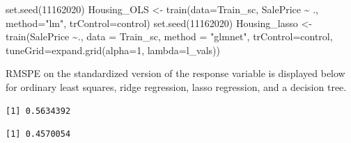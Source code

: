 \documentclass[
  letterpaper,
  DIV=11,
  numbers=noendperiod]{scrreprt}
\newenvironment{Shaded}{\begin{snugshade}}{\end{snugshade}}
\newcommand{\AttributeTok}[1]{\textcolor[rgb]{0.40,0.45,0.13}{#1}}
\newcommand{\DecValTok}[1]{\textcolor[rgb]{0.68,0.00,0.00}{#1}}
\newcommand{\FunctionTok}[1]{\textcolor[rgb]{0.28,0.35,0.67}{#1}}
\newcommand{\NormalTok}[1]{\textcolor[rgb]{0.00,0.23,0.31}{#1}}
\newcommand{\OtherTok}[1]{\textcolor[rgb]{0.00,0.23,0.31}{#1}}
\newcommand{\SpecialCharTok}[1]{\textcolor[rgb]{0.37,0.37,0.37}{#1}}
\newcommand{\StringTok}[1]{\textcolor[rgb]{0.13,0.47,0.30}{#1}}
\begin{document}
\begin{Shaded}
\begin{Highlighting}[]
\FunctionTok{set.seed}\NormalTok{(}\DecValTok{11162020}\NormalTok{)}
\NormalTok{Housing\_OLS }\OtherTok{\textless{}{-}} \FunctionTok{train}\NormalTok{(}\AttributeTok{data=}\NormalTok{Train\_sc, SalePrice }\SpecialCharTok{\textasciitilde{}}\NormalTok{ .,  }\AttributeTok{method=}\StringTok{"lm"}\NormalTok{, }\AttributeTok{trControl=}\NormalTok{control)}
\FunctionTok{set.seed}\NormalTok{(}\DecValTok{11162020}\NormalTok{)}
\NormalTok{Housing\_lasso }\OtherTok{\textless{}{-}} \FunctionTok{train}\NormalTok{(SalePrice }\SpecialCharTok{\textasciitilde{}}\NormalTok{., }\AttributeTok{data =}\NormalTok{ Train\_sc, }\AttributeTok{method =} \StringTok{"glmnet"}\NormalTok{, }\AttributeTok{trControl=}\NormalTok{control, }
                      \AttributeTok{tuneGrid=}\FunctionTok{expand.grid}\NormalTok{(}\AttributeTok{alpha=}\DecValTok{1}\NormalTok{, }\AttributeTok{lambda=}\NormalTok{l\_vals))}
\end{Highlighting}
\end{Shaded}

RMSPE on the standardized version of the response variable is displayed
below for ordinary least squares, ridge regression, lasso regression,
and a decision tree.

\begin{Shaded}
\end{Shaded}

\begin{verbatim}
[1] 0.5634392
\end{verbatim}

\begin{Shaded}
\end{Shaded}

\begin{verbatim}
[1] 0.4570054
\end{verbatim}

\begin{Shaded}
\end{Shaded}
\end{document}
